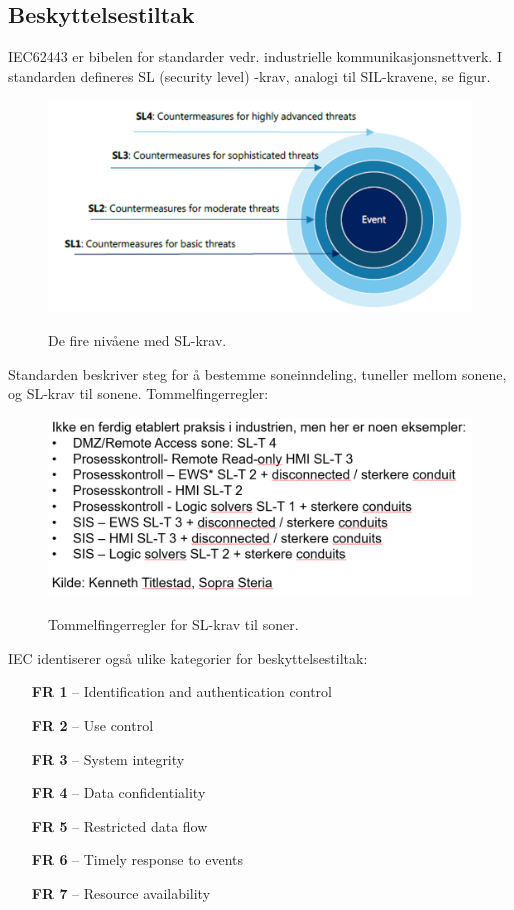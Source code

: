 \subsection{Beskyttelsestiltak}

IEC62443 er bibelen for standarder vedr. industrielle kommunikasjonsnettverk. I standarden defineres SL (security level) -krav, analogi til SIL-kravene, se figur. 

\begin{figure}[H]
    \centering
        \includegraphics[width=\textwidth]{figures/cyber/sl-krave.PNG}\\
        \caption{De fire nivåene med SL-krav.}
\end{figure}

Standarden beskriver steg for å bestemme soneinndeling, tuneller mellom sonene, og SL-krav til sonene. Tommelfingerregler:

\begin{figure}[H]
    \centering
        \includegraphics[width=\textwidth]{figures/cyber/tommel.PNG}\\
        \caption{Tommelfingerregler for SL-krav til soner.}
\end{figure}

IEC identiserer også ulike kategorier for beskyttelsestiltak:

\begin{itemize}
    \item [\textbf{FR 1}] – Identification and authentication control
    \item [\textbf{FR 2}] – Use control
    \item [\textbf{FR 3}] – System integrity 
    \item [\textbf{FR 4}] – Data confidentiality 
    \item [\textbf{FR 5}] – Restricted data flow
    \item [\textbf{FR 6}] – Timely response to events 
    \item [\textbf{FR 7}] – Resource availability
\end{itemize}


